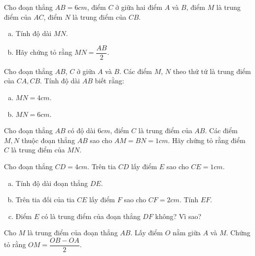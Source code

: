 \begin{bt}
\end{bt}   \begin{bt}
Cho đoạn thẳng $AB = 6 cm$, điểm $C$ ở giữa hai điểm $A$ và $B$, điểm $M$ là trung điểm của $AC$, điểm $N$ là trung điểm của $CB.$
\begin{enumerate}[a)]
\item Tính độ dài $MN$.
\item Hãy chứng tỏ rằng $MN = \dfrac{AB}{2}$.
\end{enumerate}

\end{bt}   \begin{bt}
Cho đoạn thẳng $AB$, $C$ ở giữa $A$ và $B$. Các điểm $M$, $N$ theo thứ tứ là trung điểm của $CA, CB$. Tính độ dài $AB$ biết rằng:
\begin{enumerate}[a)]
\item $MN = 4 cm.$
\item $MN = 6 cm.$
\end{enumerate}

\end{bt}   \begin{bt}
Cho đoạn thẳng $AB$ có độ dài $6 cm$, điểm $C$ là trung điểm của $AB$. Các điểm $M, N$ thuộc đoạn thẳng $AB$ sao cho $AM = BN = 1 cm$. Hãy chứng tỏ rằng điểm $C$ là trung điểm của $MN$.

\end{bt}   \begin{bt}
Cho đoạn thẳng $CD = 4 cm.$ Trên tia $CD$ lấy điểm $E$ sao cho $CE = 1 cm.$
\begin{enumerate}[a)]
\item Tính độ dài đoạn thẳng $DE$.
\item Trên tia đối của tia $CE$ lấy điểm $F$ sao cho $CF = 2 cm.$ Tính $EF$.
\item Điểm $E$ có là trung điểm của đoạn thẳng $DF$ không? Vì sao?
\end{enumerate}

\end{bt}   \begin{bt}
Cho $M$ là trung điểm của đoạn thẳng $AB$. Lấy điểm $O$ nằm giữa $A$ và $M$. Chứng tỏ rằng $OM = \dfrac{OB- OA}{2}.$
\end{bt}